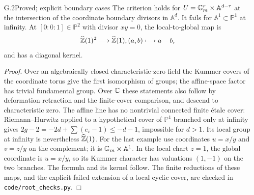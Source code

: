 \begin{claim}{G.2}{Proved; explicit boundary cases}
The criterion holds for $U=\mathbb G_m^r\times\mathbb A^{d-r}$ at the
intersection of the coordinate boundary divisors in $\mathbb A^d$.
It fails for $\mathbb A^1\subset\mathbb P^1$ at infinity. At
$[0:0:1]\in\mathbb P^2$ with divisor $xy=0$, the local-to-global map
is
\[
 \widehat{\mathbb Z}(1)^2\longrightarrow\widehat{\mathbb Z}(1),
                  (a,b)\longmapsto a-b,
\]
and has a diagonal kernel.
\end{claim}
\begin{proof}
Over an algebraically closed characteristic-zero field the Kummer
covers of the coordinate torus give the first isomorphism of groups;
the affine-space factor has trivial fundamental group. Over $\mathbb C$
these statements also follow by deformation retraction and the
finite-cover comparison, and descend to characteristic zero.
The affine line has no nontrivial connected finite \'etale cover:
Riemann--Hurwitz applied to a hypothetical cover of $\mathbb P^1$
branched only at infinity gives
$2g-2=-2d+\sum(e_i-1)\leq-d-1$, impossible for $d>1$.
Its local group at infinity is nevertheless $\widehat{\mathbb Z}(1)$.
For the last example use coordinates $u=x/y$ and $v=z/y$ on the
complement; it is $\mathbb G_m\times\mathbb A^1$. In the local chart $z=1$,
the global coordinate is $u=x/y$, so its Kummer character has
valuations $(1,-1)$ on the two branches. The formula and its kernel
follow. The finite reductions of these maps, and the explicit failed
extension of a local cyclic cover, are checked in
\texttt{code/root\_checks.py}.
\end{proof}
